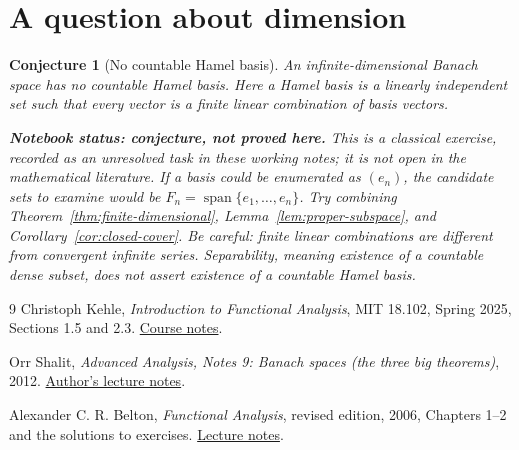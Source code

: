 \documentclass[11pt,a4paper]{article}
\theoremstyle{definition}
\theoremstyle{plain}
\newtheorem{conjecture}[definition]{Conjecture}
\newcommand{\Span}{\operatorname{span}}
\begin{document}
\section{A question about dimension}

\begin{conjecture}[No countable Hamel basis]\label{conj:hamel}
An infinite-dimensional Banach space has no countable Hamel basis.
Here a Hamel basis is a linearly independent set such that every vector
is a \emph{finite} linear combination of basis vectors.

\normalfont\smallskip
\textbf{Notebook status: conjecture, not proved here.}
This is a classical exercise, recorded as an unresolved task in these
working notes; it is not open in the mathematical literature.
If a basis could be enumerated as $(e_n)$, the candidate sets to examine
would be $F_n=\Span\{e_1,\ldots,e_n\}$.
Try combining Theorem~\ref{thm:finite-dimensional},
Lemma~\ref{lem:proper-subspace}, and Corollary~\ref{cor:closed-cover}.
Be careful: finite linear combinations are different from convergent
infinite series. Separability, meaning existence of a countable dense
subset, does not assert existence of a countable Hamel basis.
\end{conjecture}

\begin{thebibliography}{9}
Christoph Kehle, \emph{Introduction to Functional Analysis}, MIT 18.102,
Spring 2025, Sections 1.5 and 2.3.
\href{https://math.mit.edu/~kehle/files/Introduction_to_functional_analysis_18_102.pdf}{Course notes}.

Orr Shalit, \emph{Advanced Analysis, Notes 9: Banach spaces
(the three big theorems)}, 2012.
\href{https://oshalit.net.technion.ac.il/2012/11/11/advanced-analysis-notes-9-banach-spaces-the-three-big-theorems/}{Author's lecture notes}.

Alexander C. R. Belton, \emph{Functional Analysis}, revised edition, 2006,
Chapters 1--2 and the solutions to exercises.
\href{https://www.math.chalmers.se/Math/Grundutb/GU/MMA120/A14/lecture\%20notes/Belton\%20A.\%20Functional\%20analysis\%20\%28lecture\%20notes\%2C\%20free\%20web\%20version\%2C\%20Oxford\%2C\%202004\%29\%28127s\%29.pdf}{Lecture notes}.
\end{thebibliography}
\end{document}
